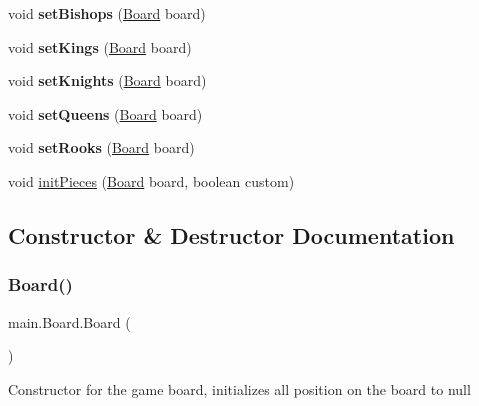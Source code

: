 \begin{DoxyCompactItemize}
\item 
\mbox{\label{classmain_1_1_board_a3295974eeb0e6fe02673aaf43a6c2709}} 
void {\bfseries set\+Bishops} (\hyperlink{classmain_1_1_board}{Board} board)
\item 
\mbox{\label{classmain_1_1_board_a3f25d1c4cf5a1140b7b3e38d9a50b737}} 
void {\bfseries set\+Kings} (\hyperlink{classmain_1_1_board}{Board} board)
\item 
\mbox{\label{classmain_1_1_board_ae8f371f340211e79784f066eeea57053}} 
void {\bfseries set\+Knights} (\hyperlink{classmain_1_1_board}{Board} board)
\item 
\mbox{\label{classmain_1_1_board_a74ea62c7573eaf06b0d59ea9f258184b}} 
void {\bfseries set\+Queens} (\hyperlink{classmain_1_1_board}{Board} board)
\item 
\mbox{\label{classmain_1_1_board_a56f872c4ad1d69c733e6c31662f1af1f}} 
void {\bfseries set\+Rooks} (\hyperlink{classmain_1_1_board}{Board} board)
\item 
void \hyperlink{classmain_1_1_board_abc9e551a462c7fec722d11e5f3728c23}{init\+Pieces} (\hyperlink{classmain_1_1_board}{Board} board, boolean custom)
\end{DoxyCompactItemize}


\subsection{Constructor \& Destructor Documentation}
\mbox{\label{classmain_1_1_board_ac64a3f3f09655e7a7c8d357571a0cdf9}} 
\subsubsection{\texorpdfstring{Board()}{Board()}}
{\footnotesize\ttfamily main.\+Board.\+Board (\begin{DoxyParamCaption}{ }\end{DoxyParamCaption})}

Constructor for the game board, initializes all position on the board to null 

